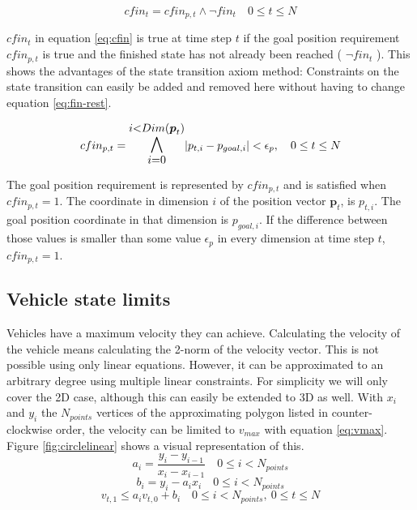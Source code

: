 \begin{equation}
\label{eq:cfin}
cfin_t =  cfin_{p,t} \wedge \neg fin_t\quad 0 \leq t \leq N
\end{equation}

 $cfin_t$ in equation \ref{eq:cfin} is true at time step $t$ if the goal position requirement $cfin_{p,t}$ is true and the finished state has not already been reached ( $ \neg fin_t$ ). This shows the advantages of the state transition axiom method: Constraints on the state transition can easily be added and removed here without having to change equation \ref{eq:fin-rest}.

\begin{equation}
\label{eq:cfin-p}
cfin_{p,t} =  \mathlarger{\mathlarger{\bigwedge_{i = 0}^{i < Dim(\boldsymbol{p}_t)}}} |p_{t,i} - p_{goal, i}| < \epsilon_{p},  \quad 0 \leq t \leq N
\end{equation}

The goal position requirement is represented by $cfin_{p,t}$ and is satisfied when $cfin_{p,t} = 1$. The coordinate in dimension $i$ of the position vector $\boldsymbol{p}_t$, is $p_{t,i}$. The goal position coordinate in that dimension is $p_{goal, i}$. If the difference between those values is smaller than some value $\epsilon_p$ in every dimension at time step $t$,  $cfin_{p,t} = 1$.

\subsection{Vehicle state limits}

Vehicles have a maximum velocity they can achieve. Calculating the velocity of the vehicle means calculating the 2-norm of the velocity vector. This is not possible using only linear equations. However, it can be approximated to an arbitrary degree using multiple linear constraints. For simplicity we will only cover the 2D case, although this can easily be extended to 3D as well. With $x_i$ and $y_i$ the $N_{points}$ vertices of the approximating polygon listed in counter-clockwise order, the velocity can be limited to $v_{max}$ with equation \ref{eq:vmax}. Figure \ref{fig:circlelinear} shows a visual representation of this.
\begin{equation}
\label{eq:lin-a}
a_i = \dfrac{y_{i} - y_{i-1}}{x_{i} - x_{i-1}} \quad 0 \leq i < N_{points}
\end{equation}
\begin{equation}
\label{eq:lin-b}
b_i = y_{i} - a_i x_i  \quad 0 \leq i < N_{points}
\end{equation}
\begin{equation}
\label{eq:vmax}
v_{t, 1} \leq a_i v_{t,0} + b_i  \quad 0 \leq i < N_{points}, ~ 0 \leq t \leq N
\end{equation}

